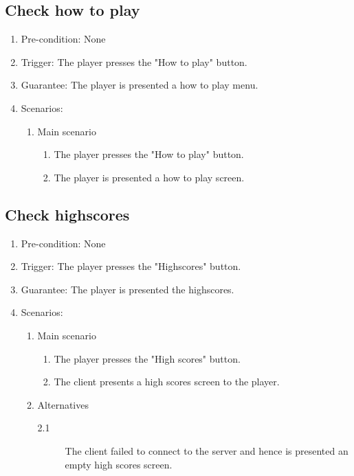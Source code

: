 \documentclass[a4paper,twoside,11pt]{article}
\begin{document}
\subsection*{Check how to play}
\begin{enumerate}
\item Pre-condition: None
\item Trigger: The player presses the "How to play" button.
\item Guarantee: The player is presented a how to play menu.
\item Scenarios: 
	\begin{enumerate}
	\item Main scenario
		\begin{enumerate}[1)]
		\item The player presses the "How to play" button.
		\item The player is presented a how to play screen.
		\end{enumerate}
	\end{enumerate}
\end{enumerate}
\subsection*{Check highscores}
\begin{enumerate}
\item Pre-condition: None 
\item Trigger: The player presses the "Highscores" button.
\item Guarantee: The player is presented the highscores.
\item Scenarios: 
	\begin{enumerate}
	\item Main scenario
		\begin{enumerate}[1)]
		\item The player presses the "High scores" button.
		\item The client presents a high scores screen to the player.
		\end{enumerate}
	\item Alternatives
		\begin{description}
		\item[2.1] The client failed to connect to the server and hence 		is presented an empty high scores screen.
		\end{description}
	\end{enumerate}
\end{enumerate}
\end{document}
